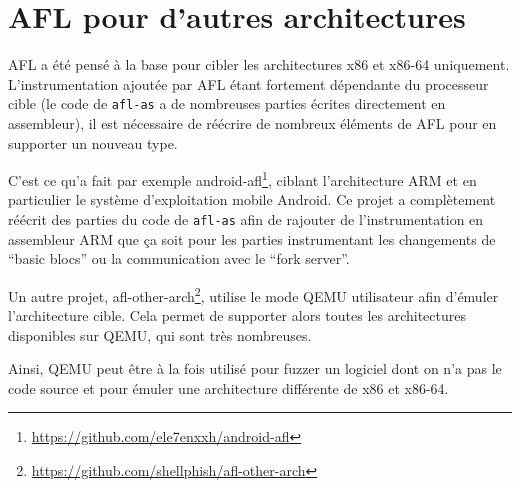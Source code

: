 \section{AFL pour d'autres architectures}

AFL a été pensé à la base pour cibler les architectures x86 et x86-64 uniquement.
L'instrumentation ajoutée par AFL étant fortement dépendante du processeur cible (le code de \lstinline{afl-as} a de nombreuses parties écrites directement en assembleur), il est nécessaire de réécrire de nombreux éléments de AFL pour en supporter un nouveau type.

C'est ce qu'a fait par exemple android-afl\footnote{\url{https://github.com/ele7enxxh/android-afl}}, ciblant l'architecture ARM et en particulier le système d'exploitation mobile Android.
Ce projet a complètement réécrit des parties du code de \lstinline{afl-as} afin de rajouter de l'instrumentation en assembleur ARM que ça soit pour les parties instrumentant les changements de ``basic blocs'' ou la communication avec le ``fork server''.

Un autre projet, afl-other-arch\footnote{\url{https://github.com/shellphish/afl-other-arch}}, utilise le mode QEMU utilisateur afin d'émuler l'architecture cible.
Cela permet de supporter alors toutes les architectures disponibles sur QEMU, qui sont très nombreuses.

Ainsi, QEMU peut être à la fois utilisé pour fuzzer un logiciel dont on n'a pas le code source et pour émuler une architecture différente de x86 et x86-64.
